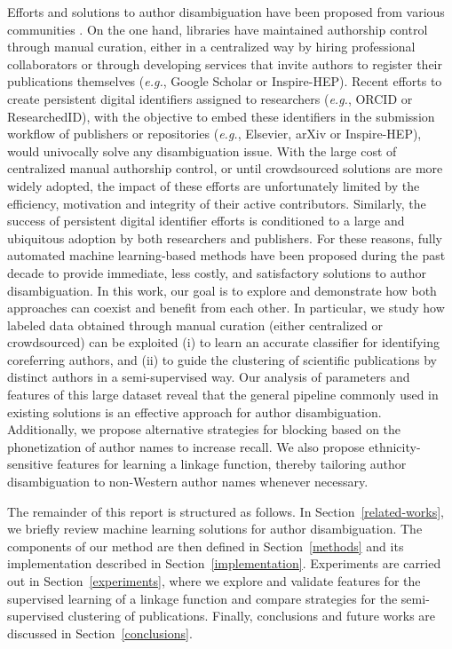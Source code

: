 \documentclass{article}
\newcommand{\eg}{\emph{e.g.}\xspace}
\begin{document}
Efforts and solutions to author disambiguation have been proposed from various
communities \citep{liu2014author}. On the one hand, libraries have maintained
authorship control through manual curation, either in a centralized way by
hiring professional collaborators or through developing services that invite authors to register
their publications themselves (\eg, Google Scholar or Inspire-HEP).
Recent efforts to create persistent digital identifiers assigned to researchers (\eg, ORCID or ResearchedID),
with the objective to embed these identifiers in the submission workflow of publishers
or repositories (\eg, Elsevier, arXiv or Inspire-HEP), would univocally solve any disambiguation issue.
With the large cost of centralized manual authorship control, or until crowdsourced solutions are more
widely adopted, the impact of these efforts are unfortunately limited by the efficiency, motivation
and integrity of their active contributors. Similarly, the success of persistent digital identifier efforts
is conditioned to a large and ubiquitous adoption by both researchers and publishers.
For these reasons, fully automated machine learning-based methods have been proposed during the past decade to
provide immediate, less costly, and satisfactory solutions to author
disambiguation. In this work, our goal is to explore and demonstrate how both
approaches can coexist and benefit from each other.
In particular, we study how labeled data obtained through manual curation (either centralized or
crowdsourced) can be exploited (i) to learn an accurate classifier for
identifying coreferring authors, and (ii) to guide the clustering of scientific
publications by distinct authors in a semi-supervised way.
Our analysis of parameters and features of this large dataset reveal that the general pipeline
commonly used in existing solutions is an effective approach for author disambiguation.
Additionally, we propose alternative strategies for blocking based on the
phonetization of author names to increase recall.
We also propose ethnicity-sensitive features for learning a linkage function,
thereby tailoring author disambiguation to non-Western author names whenever necessary.

The remainder of this report is structured as follows. In Section~\ref{related-works},
we briefly review machine learning solutions for author disambiguation.
The components of our method are then defined in Section~\ref{methods}
and its implementation described in Section~\ref{implementation}. Experiments
are carried out in Section~\ref{experiments}, where we explore and validate
features for the supervised learning of a linkage function and compare
strategies for the semi-supervised clustering of publications.
Finally, conclusions and future works are discussed in Section~\ref{conclusions}.
\end{document}
